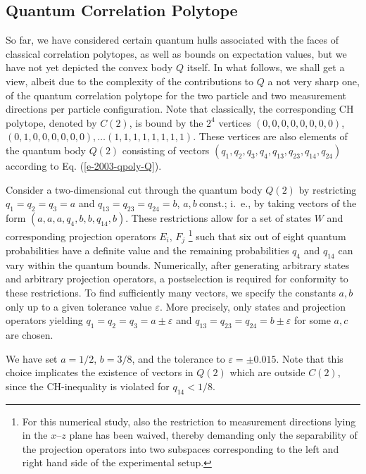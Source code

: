 \subsection{Quantum Correlation Polytope}

So far, we have considered certain quantum hulls associated with
the faces of classical correlation polytopes, as well as bounds on expectation values,
but we have not yet  depicted
the convex body $Q$ itself.
In what follows, we shall get a view,
albeit due to the complexity of the contributions to $Q$ a not very sharp one,
of the quantum correlation polytope
for the two particle and two measurement directions per particle configuration.
Note that classically,
the corresponding CH polytope, denoted by $C(2)$, is bound by the $2^4$ vertices
$
(0,0,0,0,0,0,0,0)
$,
$
(0,1,0,0,0,0,0,0),
\ldots
(1,1,1,1,1,1,1,1)
$.
These vertices are also elements of the quantum body $Q(2)$ consisting of vectors
$(q_{1},q_{2},q_3,q_4,q_{13},q_{23},q_{14},q_{24})$ according to
Eq. (\ref{e-2003-qpoly-Q}).

Consider a two-dimensional
cut through the quantum body $Q(2)$ by restricting
$q_{1}=q_{2}=q_{3}=a$ and $q_{13}=q_{23}=q_{24}=b$, $a,b\
\mbox{const.}$; i.~e., by taking vectors of the form
$(a,a,a,q_4,b,b,q_{14},b)$.
These restrictions allow for a set of states
$W$
and corresponding projection operators $E_i,\,F_j$
\footnote{For this numerical study, also
  the restriction to measurement directions lying in the
  $x$--$z$ plane has been waived, thereby demanding only the separability of the
  projection operators into two subspaces corresponding to the left
  and right hand side of the experimental setup.}
such that six out of
eight quantum probabilities have a definite value and the remaining
probabilities $q_4$ and $q_{14}$ can vary within the quantum
bounds.
Numerically, after generating
arbitrary states and arbitrary projection operators,
a postselection is required for conformity to these restrictions.
To find sufficiently many vectors,
we specify the constants $a,b$ only up to a given tolerance value $\varepsilon$.
More precisely, only states and projection operators yielding
 $q_{1}=q_{2}=q_{3}=a\pm\varepsilon$ and
$q_{13}=q_{23}=q_{24}=b\pm\varepsilon$ for some $a,c$ are chosen.

We have set $a=1/2$, $b=3/8$, and the tolerance to $\varepsilon=\pm
0.015$.
Note that this choice implicates the existence of vectors in $Q(2)$ which are
outside $C(2)$, since the CH-inequality
is violated for $q_{14}<1/8$.



